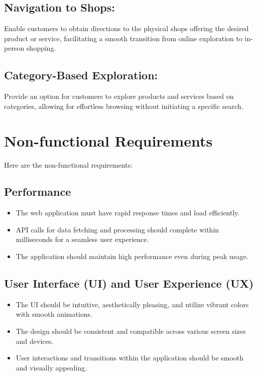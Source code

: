 \subsection{Navigation to Shops:}
Enable customers to obtain directions to the physical shops offering the desired product or service, facilitating a smooth transition from online exploration to in-person shopping.

\subsection{Category-Based Exploration:}
Provide an option for customers to explore products and services based on categories, allowing for effortless browsing without initiating a specific search.



\section{Non-functional Requirements}
Here are the non-functional requirements:

\subsection{Performance}
\begin{itemize}
	\item The web application must have rapid response times and load efficiently.
	\item API calls for data fetching and processing should complete within milliseconds for a seamless user experience.
	\item The application should maintain high performance even during peak usage.
\end{itemize}

\subsection{User Interface (UI) and User Experience (UX)}
\begin{itemize}
	\item The UI should be intuitive, aesthetically pleasing, and utilize vibrant colors with smooth animations.
	\item The design should be consistent and compatible across various screen sizes and devices.
	\item User interactions and transitions within the application should be smooth and visually appealing.
\end{itemize}

